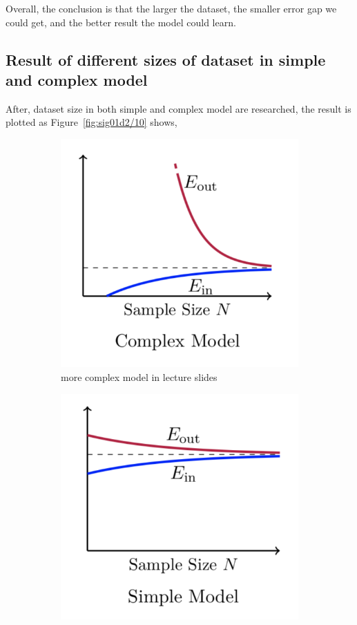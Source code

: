 \documentclass[12pt,letterpaper]{article}
\begin{document}
Overall, the conclusion is that the larger the dataset, the smaller error gap we could get, and the better result the model could learn.

\subsection{Result of different sizes of dataset in simple and complex model}

After, dataset size in both simple and complex model are researched, the result is plotted as Figure~\ref{fig:sig01d2/10} shows,

\begin{figure}[h]
\centering
\begin{subfigure}{.45\textwidth}
  \centering
  \includegraphics[width=.9\linewidth]{lectureComplexModel.png}
  \caption{\small more complex model in lecture slides}
  \label{fig:sub1}
\end{subfigure}
\begin{subfigure}{.45\textwidth}
  \centering
  \includegraphics[width=.9\linewidth]{lectureSimpleModel.png}

\end{subfigure}
\end{figure}
\end{document}
